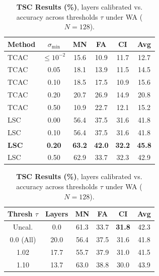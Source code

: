\documentclass{article}
\theoremstyle{plain}
\theoremstyle{definition}
\theoremstyle{remark}
\begin{document}
\begin{table}[t]
\begin{minipage}{0.31\textwidth}
\caption{\textbf{Clamping $\sigma_{\min}$ Ablation (\%)}, LSC vs TCAC under WA ($N=128$).}
\label{tab:epsilon_results}
\vskip 0.05in
\begin{center}
\begin{small}
\begin{sc}
\setlength{\tabcolsep}{1.1pt}
\begin{tabular}{lccccc}
\toprule
Method & $\sigma_{\min}$ & MN & FA & CI & \textbf{Avg} \\
\midrule
TCAC & $\le 10^{-2}$ & 15.6 & 10.9 & 11.7 & 12.7 \\
TCAC & 0.05 & 18.1 & 13.9 & 11.5 & 14.5 \\
TCAC & 0.10 & 18.5 & 17.5 & 10.9 & 15.6 \\
TCAC & 0.20 & 20.7 & 26.9 & 14.9 & 20.8 \\
TCAC & 0.50 & 10.9 & 22.7 & 12.1 & 15.2 \\
\midrule
LSC & 0.00 & 56.4 & 37.5 & 31.6 & 41.8 \\
LSC & 0.10 & 56.4 & 37.5 & 31.6 & 41.8 \\
\textbf{LSC} & \textbf{0.20} & \textbf{63.2} & \textbf{42.0} & \textbf{32.2} & \textbf{45.8} \\
LSC & 0.50 & 62.9 & 33.7 & 32.3 & 42.9 \\
\bottomrule
\end{tabular}
\end{sc}
\end{small}
\end{center}
\end{minipage}
\hfill
\begin{minipage}{0.34\textwidth}
\caption{\textbf{TSC Results (\%)}, layers calibrated vs. accuracy across thresholds $\tau$ under WA ($N=128$).}
\label{tab:tsc_results}
\vskip 0.05in
\begin{center}
\begin{small}
\begin{sc}
\setlength{\tabcolsep}{1.1pt}
\begin{tabular}{cccccc}
\toprule
Thresh $\tau$ & Layers & MN & FA & CI & \textbf{Avg} \\
\midrule
Uncal. & 0.0 & 61.3 & 33.7 & \textbf{31.8} & 42.3 \\
\midrule
0.0 (All) & 20.0 & 56.4 & 37.5 & 31.6 & 41.8 \\
1.02 & 17.7 & 55.7 & 37.9 & 31.0 & 41.5 \\
1.10 & 13.7 & 63.0 & 38.8 & 30.0 & 43.9 \\

\end{tabular}
\end{sc}
\end{small}
\end{center}
\end{minipage}
\end{table}
\end{document}
